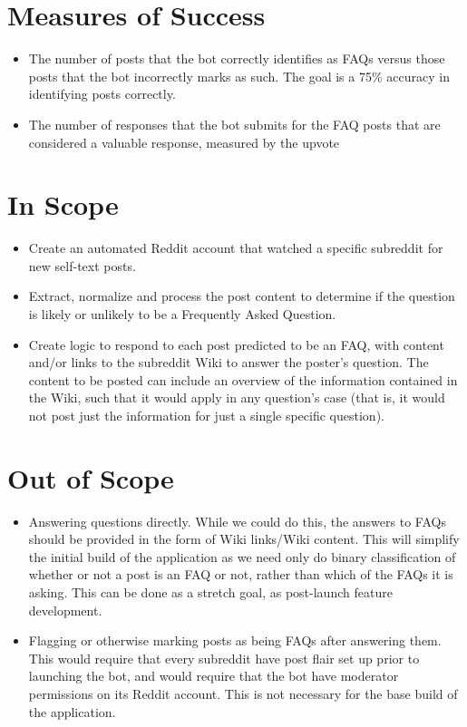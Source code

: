\documentclass[dvips,11pt]{article}
\begin{document}
\section{Measures of Success}

\begin{itemize}
\item The number of posts that the bot correctly identifies as FAQs versus those posts that the bot incorrectly marks as such. The goal is a 75\% accuracy in identifying posts correctly.
\item The number of responses that the bot submits for the FAQ posts that are considered a valuable response, measured by the upvote
\end{itemize}

\section{In Scope}

\begin{itemize}
\item Create an automated Reddit account that watched a specific subreddit for new self-text posts.
\item Extract, normalize and process the post content to determine if the question is likely or unlikely to be a Frequently Asked Question.
\item Create logic to respond to each post predicted to be an FAQ, with content and/or links to the subreddit Wiki to answer the poster's question. The content to be posted can include an overview of the information contained in the Wiki, such that it would apply in any question's case (that is, it would not post just the information for just a single specific question).
\end{itemize}

\section{Out of Scope}

\begin{itemize}
\item Answering questions directly. While we could do this, the answers to FAQs should be provided in the form of Wiki links/Wiki content. This will simplify the initial build of the application as we need only do binary classification of whether or not a post is an FAQ or not, rather than which of the FAQs it is asking. This can be done as a stretch goal, as post-launch feature development.
\item Flagging or otherwise marking posts as being FAQs after answering them. This would require that every subreddit have post flair set up prior to launching the bot, and would require that the bot have moderator permissions on its Reddit account. This is not necessary for the base build of the application.
\end{itemize}
\end{document}

